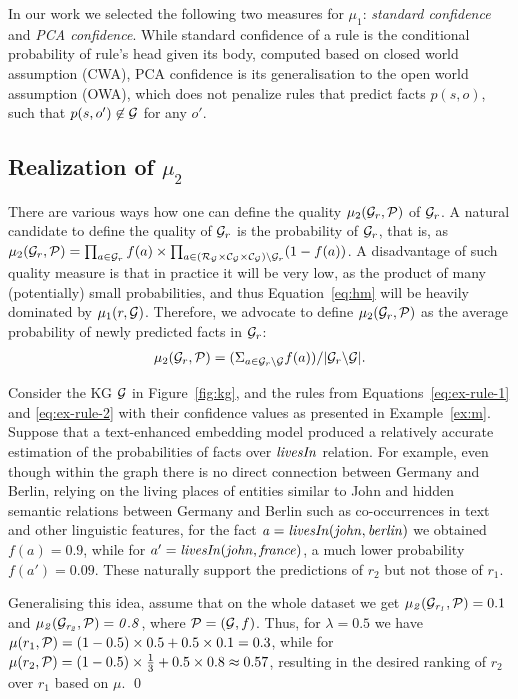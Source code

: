 In our work we selected the following two measures for $\mu_1$:
\emph{standard confidence} and \emph{PCA confidence}. While standard confidence of a rule is the conditional probability of rule's head given its body, computed based on closed world assumption (CWA), PCA confidence is its generalisation to the open world assumption (OWA), which does not penalize rules that predict facts $p(s,o)$, such that $p(s,o')\not \in \mathcal{G}$ for any $o'$. 

\subsection{Realization of $\mu_2$}
There are various ways how one can define the quality $\mu_2(\mathcal{G}_r,\mathcal{P})$ of $\mathcal{G}_r$.
A natural candidate to define the quality of $\mathcal{G}_r$ is the probability of $\mathcal{G}_r$, that is, as
$\mu_2(\mathcal{G}_r,\mathcal{P})=\prod_{a \in \mathcal{G}_r} f(a) \times \prod_{a \in (\mathcal{R}_\mathcal{G}\times\mathcal{C}_\mathcal{G}\times\mathcal{C}_\mathcal{G})\setminus \mathcal{G}_r} (1-f(a))$.
A disadvantage of such quality measure is that in practice it will be very low,
as the product of many (potentially) small probabilities,
and thus Equation~\ref{eq:hm} will be heavily dominated by $\mu_1(r,\mathcal{G})$. Therefore,
we advocate 
to define $\mu_2(\mathcal{G}_r,\mathcal{P})$ as %
the average probability of newly predicted facts in $\mathcal{G}_r$:
\begin{align}
	\mu_2(\mathcal{G}_r,\mathcal{P}) = (\Sigma_{a\in \mathcal{G}_r\backslash \mathcal{G}} f(a)) /
				|\mathcal{G}_r \backslash \mathcal{G}|.
\end{align}

\begin{example}\label{ex:hm}
Consider the KG $\mathcal{G}$ in Figure~\ref{fig:kg}, and the rules from Equations~\ref{eq:ex-rule-1} and \ref{eq:ex-rule-2} with their confidence values as presented in Example~\ref{ex:m}. Suppose that a text-enhanced embedding model produced a relatively accurate estimation of the probabilities of facts over $\mathit{livesIn}$ relation. For example, even though within the graph there is no direct connection between Germany and Berlin, relying on the living places of entities similar to John and hidden semantic relations between Germany and Berlin such as co-occurrences in text and other linguistic features, for the fact $\mathit{a=livesIn(john,berlin)}$ we obtained $f(a)=0.9$, while for $a'=\mathit{livesIn(john,france)}$, a much lower probability $f(a')=0.09$. These naturally support the predictions of $r_2$ but not those of $r_1$.

Generalising this idea, assume that on the whole dataset we get $\mathit{\mu_2(\mathcal{G}_{r_1},\mathcal{P})}=0.1$ and $\mathit{\mu_2(\mathcal{G}_{r_2},\mathcal{P})=0.8}$, where $\mathcal{P}=(\mathcal{G},f)$. Thus, for $\lambda=0.5$ we have $\mu(r_1,\mathcal{P})=(1-0.5)\times 0.5+0.5\times 0.1 = 0.3$, while for $\mu(r_2,\mathcal{P})=(1-0.5) \times \frac{1}{3}+0.5\times 0.8\approx 0.57$, resulting in the desired ranking of $r_2$ over $r_1$ based on $\mu$.
\qed 
\end{example}

